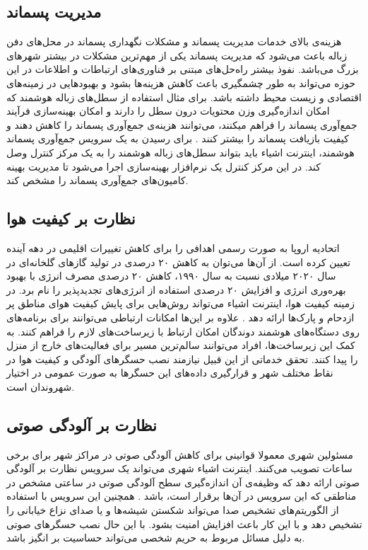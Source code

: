     \subsection{مدیریت پسماند}
      هزینه‌ی بالای خدمات مدیریت پسماند و مشکلات نگهداری پسماند در محل‌های دفن زباله باعث می‌شود که مدیریت پسماند یکی از مهم‌ترین مشکلات در بیشتر شهر‌های بزرگ می‌باشد.
      نفوذ بیشتر راه‌حل‌های مبتنی بر فناوری‌های ارتباطات و اطلاعات در این حوزه می‌تواند به طور چشمگیری باعث کاهش هزینه‌ها بشود و بهبود‌هایی در زمینه‌های اقتصادی و زیست محیط داشته باشد.
      برای مثال استفاده از سطل‌های زباله هوشمند که امکان اندازه‌گیری وزن محتویات درون سطل را دارند و امکان بهینه‌سازی فرآیند جمع‌آوری پسماند را فراهم میکنند، می‌توانند هزینه‌ی جمع‌آوری پسماند را کاهش دهند و کیفیت بازیافت پسماند را بیشتر کنند \cite{nuortio2006improved}.
      برای رسیدن به یک سرویس جمع‌آوری پسماند هوشمند، اینترنت اشیاء باید بتواند سطل‌های زباله هوشمند را به یک مرکز کنترل وصل کند.
      در این مرکز کنترل یک نرم‌افزار بهینه‌سازی اجرا می‌شود تا مدیریت بهینه کامیون‌های جمع‌آوری پسماند را مشخص کند.

    \subsection{نظارت بر کیفیت هوا}
      اتحادیه اروپا به صورت رسمی اهدافی را برای کاهش تغییرات اقلیمی در دهه آینده تعیین کرده است.
      از آن‌ها می‌توان به کاهش ۲۰ درصدی در تولید گاز‌های گلخانه‌ای در سال ۲۰۲۰ میلادی نسبت به سال ۱۹۹۰، کاهش ۲۰ درصدی مصرف انرژی با بهبود بهره‌وری انرژی و افزایش ۲۰ درصدی استفاده از انرژی‌های تجدید‌پذیر را نام برد.
      در زمینه کیفیت هوا، اینترنت اشیاء می‌تواند روش‌هایی برای پایش کیفیت هوای مناطق پر ازدحام و پارک‌ها ارائه دهد \cite{al2010mobile}.
      علاوه بر این‌ها امکانات ارتباطی می‌توانند برای برنامه‌های روی دستگاه‌های هوشمند دوندگان امکان ارتباط با زیرساخت‌های لازم را فراهم کنند.
      به کمک این زیرساخت‌ها، افراد می‌توانند سالم‌ترین مسیر برای فعالیت‌های خارج از منزل را پیدا کنند.
      تحقق خدماتی از این قبیل نیازمند نصب حسگر‌های آلودگی و کیفیت هوا در نقاط مختلف شهر و قرارگیری داده‌های این حسگر‌ها به صورت عمومی در اختیار شهروندان است.

    \subsection{نظارت بر آلودگی صوتی}
      مسئولین شهری معمولا قوانینی برای کاهش آلودگی صوتی در مراکز شهر برای برخی ساعات تصویب می‌کنند.
      اینترنت اشیاء شهری می‌تواند یک سرویس نظارت بر آلودگی صوتی ارائه دهد که وظیفه‌ی آن اندازه‌گیری سطح آلودگی صوتی در ساعتی مشخص در مناطقی که این سرویس در آن‌ها برقرار است، باشد \cite{maisonneuve2009citizen}.
      همچنین این سرویس با استفاده از الگوریتم‌های تشخیص صدا می‌تواند شکستن شیشه‌ها و یا صدای نزاع خیابانی را تشخیص دهد و با این کار باعث افزایش امنیت بشود.
      با این حال نصب حسگر‌های صوتی به دلیل مسائل مربوط به حریم شخصی می‌تواند حساسیت بر انگیز باشد.

